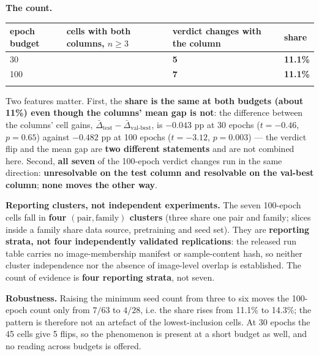 \documentclass[pdflatex,sn-mathphys-ay]{sn-jnl}
\begin{document}
\textbf{The count.}

{\footnotesize
\setlength{\tabcolsep}{4pt}
\begin{longtable}{p{}>{\raggedleft\arraybackslash}p{}>{\raggedleft\arraybackslash}p{}>{\raggedleft\arraybackslash}p{}}
\toprule
epoch budget & cells with both columns, $n\ge3$ & \textbf{verdict changes with the column} & share \\
\midrule
\endhead
30 & 45 & \textbf{5} & \textbf{11.1\%} \\
100 & 63 & \textbf{7} & \textbf{11.1\%} \\
\botrule
\end{longtable}}

Two features matter. First, the \textbf{share is the same at both budgets (about 11\%) even though the columns' mean gap is not}: the difference between the columns' cell gains, $\bar\Delta_{\text{test}}-\bar\Delta_{\text{val-best}}$, is $-0.043$ pp at 30 epochs ($t=-0.46$, $p=0.65$) against $-0.482$ pp at 100 epochs ($t=-3.12$, $p=0.003$) --- the verdict flip and the mean gap are \textbf{two different statements} and are not combined here. Second, \textbf{all seven} of the 100-epoch verdict changes run in the same direction: \textbf{unresolvable on the test column and resolvable on the val-best column}; \textbf{none moves the other way}.

\textbf{Reporting clusters, not independent experiments.} The seven 100-epoch cells fall in \textbf{four $(\text{pair},\text{family})$ clusters} (three share one pair and family; slices inside a family share data source, pretraining and seed set). They are \textbf{reporting strata, not four independently validated replications}: the released run table carries no image-membership manifest or sample-content hash, so neither cluster independence nor the absence of image-level overlap is established. The count of evidence is \textbf{four reporting strata}, not seven.

\textbf{Robustness.} Raising the minimum seed count from three to six moves the 100-epoch count only from $7/63$ to $4/28$, i.e. the share rises from 11.1\% to 14.3\%; the pattern is therefore not an artefact of the lowest-inclusion cells. At 30 epochs the 45 cells give 5 flips, so the phenomenon is present at a short budget as well, and no reading across budgets is offered.
\end{document}
